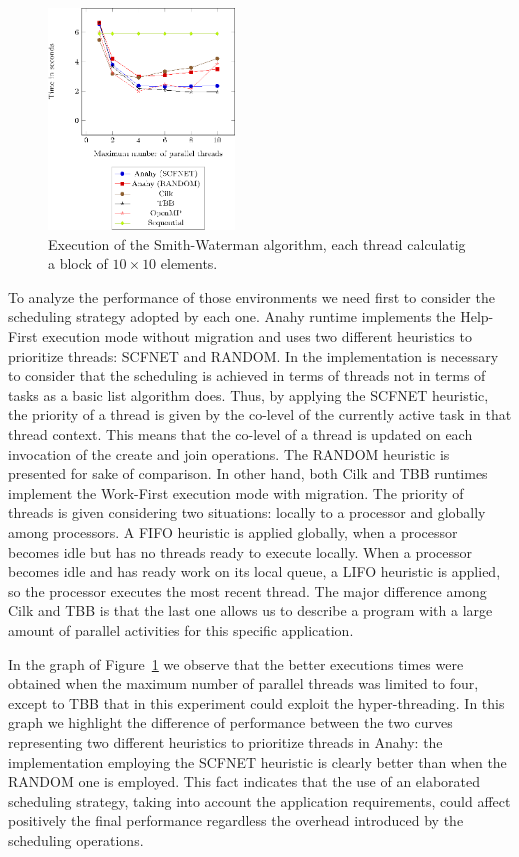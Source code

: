 \documentclass[twocolumn]{svjour3}
\begin{document}
\begin{figure}[]
	\centering	
	\includegraphics[width=0.44\textwidth,angle=0]{figs/sw_1000_10.eps}
	\caption{Execution of the Smith-Waterman algorithm, each thread calculatig a block of $10 \times 10$ elements.}
	\label{fig:SW}
\end{figure}


To analyze the performance of those environments we need first to consider the scheduling strategy adopted by each one. Anahy runtime implements the Help-First execution mode without migration and uses two different heuristics to prioritize threads: SCFNET and RANDOM. In the implementation is necessary to consider that the scheduling is achieved in terms of threads not in terms of tasks as a basic list algorithm does. Thus, by applying the SCFNET heuristic, the priority of a thread is given by the co-level of the currently active task in that thread context. This means that the co-level of a thread is updated on each invocation of the create and join operations. The RANDOM heuristic is presented for sake of comparison. In other hand, both Cilk and TBB runtimes implement the Work-First execution mode with migration. The priority of threads is given considering two situations: locally to a processor and globally among processors. A FIFO heuristic is applied globally, when a processor becomes idle but has no threads ready to execute locally. When a processor becomes idle and has ready work on its local queue, a LIFO heuristic is applied, so the processor executes the most recent thread. The major difference among Cilk and TBB is that the last one allows us to describe a program with a large amount of parallel activities for this specific application.

In the graph of Figure~\ref{fig:SW} we observe that the better executions times were obtained when the maximum number of parallel threads was limited to four, except to TBB that in this experiment could exploit the hyper-threading. In this graph we highlight the difference of performance between the two curves representing two different heuristics to prioritize threads in Anahy: the implementation employing the SCFNET heuristic is clearly better than when the RANDOM one is employed. This fact indicates that the use of an elaborated scheduling strategy, taking into account the application requirements, could affect positively the final performance regardless the overhead introduced by the scheduling operations.
\end{document}
